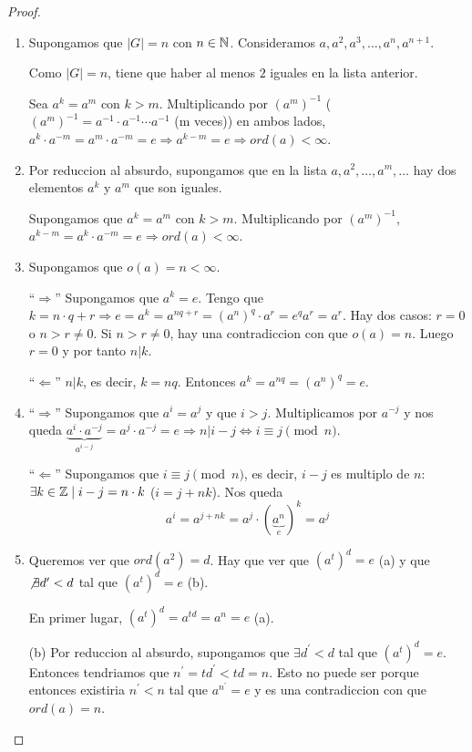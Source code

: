 \begin{proof}
	\begin{enumerate}
		\item Supongamos que \(|G| = n \) con \(n \in \mathbb{N} \). Consideramos \(a, a^{2}, a^{3}, \ldots, a^{n}, a^{n+1 }    \).
		      
		      Como \(|G| = n \), tiene que haber al menos \(2 \) iguales en la lista anterior.
		      
		      Sea \(a^{k} = a^{m } \) con \(k > m \). Multiplicando por \((a^{m} )^{-1} \) (\((a^{m} )^{-1} = a^{-1} \cdot a^{-1} \cdots a^{-1} \) (m veces)) en ambos lados, \(a^{k} \cdot a^{-m} = a^{m} \cdot a^{-m} = e \Rightarrow a^{k-m}= e \Rightarrow ord(a) < \infty     \).
		\item Por reduccion al absurdo, supongamos que en la lista \(a, a^{2}, \ldots, a^{m}, \ldots  \) hay dos elementos \(a^{k } \) y \(a^{m } \) que son iguales.
		      
		      Supongamos que \(a^{k} = a^{m } \) con \(k > m \). Multiplicando por \((a^{m} )^{-1} \), \(a^{k - m} = a^{k} \cdot a^{-m} = e \Rightarrow ord(a) < \infty   \).
		\item Supongamos que \(o(a) = n < \infty \).
		      
		      ``\(\Rightarrow \)'' Supongamos que \(a^{k} = e \). Tengo que \(k = n \cdot q + r \Rightarrow e = a^{k} = a^{nq + r} = (a^{n} )^{q} \cdot a^{r} = e^{q} a^{r}  = a^{r}    \). Hay dos casos: \(r = 0 \) o \(n > r \neq 0 \). Si \(n > r \neq 0\), hay una contradiccion con que \(o(a) = n \). Luego \(r = 0 \) y por tanto \(n|k \).
		      
		      ``\(\Leftarrow \)'' \(n|k \), es decir, \(k = n q\). Entonces \(a^{k} = a^{nq} = (a^{n} )^{q} = e   \).
		\item
		
		      ``\(\Rightarrow \)'' Supongamos que \(a^{i} = a^{j }  \)  y que \(i > j \). Multiplicamos por \(a^{-j } \) y nos queda \(\underbrace{a^{i} \cdot a^{-j} }_{a^{i-j} }= a^{j} \cdot a^{-j} = e   \Rightarrow n|i - j \iff i \equiv j  \pmod n\).
		      
		      ``\(\Leftarrow \)'' Supongamos que \(i \equiv j \pmod n \), es decir, \(i - j \) es multiplo de \(n \): \(\exists k \in \mathbb{Z} \mid i - j = n \cdot k \) (\(i = j + nk \)). Nos queda
		      \[
			      a^{i} = a^{j + nk} = a^{j} \cdot (\underbrace{a^{n}}_{e})^{k} = a^{j }
		      \]
		\item Queremos ver que \(ord(a^{2} ) = d \). Hay que ver que \((a^{t} )^{d} = e \) (a) y que \(\not \exists d^\prime < d \) tal que \((a^{t} )^{d} = e \) (b).
		      
		      En primer lugar, \((a^{t} )^{d} = a^{td} = a^{n} = e   \) (a).
		      
		      (b) Por reduccion al absurdo, supongamos que \(\exists d^\prime  < d \) tal que \((a^{t} )^{d} = e \). Entonces tendriamos que \(n^\prime  = td^\prime < td = n \). Esto no puede ser porque entonces existiria \(n^\prime < n \) tal que \(a^{n^\prime } = e\) y es una contradiccion con que \(ord(a) = n \).
	\end{enumerate}
\end{proof}
